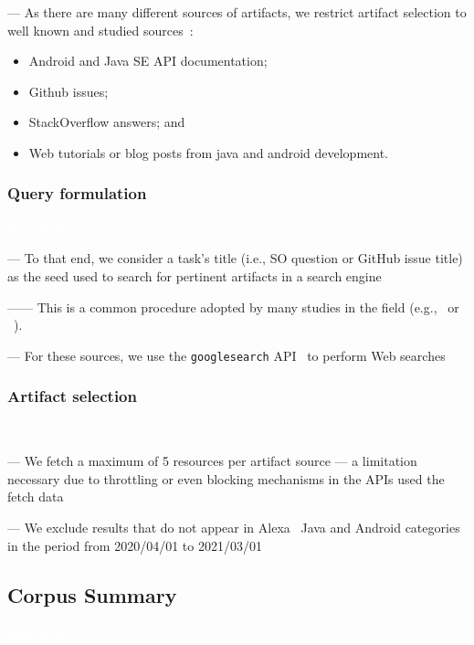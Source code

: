 --- As there are many different sources of artifacts, we restrict artifact selection to well known and studied sources~\cite{Starke2009,Kevic2014, Li2013}:


\begin{itemize}
    \item Android and Java SE API documentation;
    \item Github issues;
    \item StackOverflow answers; and
    \item Web tutorials or blog posts from java and android development.
\end{itemize}


\vspace{3mm}


\subsubsection{Query formulation}
\textcolor{white}{force ident} %

--- To that end, we consider a task's title (i.e., SO question or GitHub issue title) as the seed used to search for pertinent artifacts in a search engine

------ This is a common procedure adopted by many studies in the field (e.g.,~\cite{Xu2017} or ~\cite{Silva2019}). \vspace{3mm}


--- For these sources, we use the \texttt{googlesearch} API~\cite{googlesearch} to perform Web searches


\subsubsection{Artifact selection}
\textcolor{white}{force ident} %

--- We fetch a maximum of 5 resources per artifact source --- a limitation necessary due to throttling or even blocking mechanisms in the APIs used the fetch data \vspace{3mm}

--- We exclude results that do not appear in Alexa~\cite{alexa} Java and Android categories in the period from 2020/04/01
to 2021/03/01





\subsection{Corpus Summary}
\textcolor{white}{force ident} %


